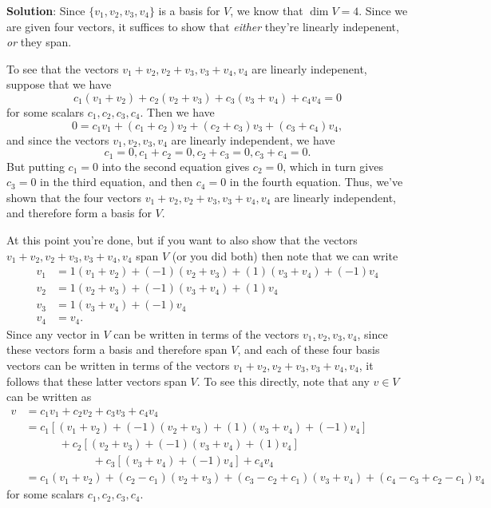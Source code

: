 \documentclass[12pt]{article}
\begin{document}
\begin{enumerate}
\bigskip

{\bf Solution}: Since $\{v_1,v_2,v_3,v_4\}$ is a basis for $V$, we know that $\dim V=4$. Since we are given four vectors, it suffices to show that {\em either} they're linearly indepenent,  {\em or} they span.

To see that the vectors $ v_1+v_2,v_2+v_3,v_3+v_4,v_4$ are linearly indepenent, suppose that we have
\[
 c_1(v_1+v_2)+c_2(v_2+v_3)+c_3(v_3+v_4)+c_4v_4=0
\]
for some scalars $c_1,c_2,c_3,c_4$. Then we have
\[
 0 = c_1v_1+(c_1+c_2)v_2+(c_2+c_3)v_3+(c_3+c_4)v_4,
\]
and since the vectors $v_1,v_2,v_3,v_4$ are linearly independent, we have
\[
 c_1=0, c_1+c_2=0, c_2+c_3=0, c_3+c_4=0.
\]
But putting $c_1=0$ into the second equation gives $c_2=0$, which in turn gives $c_3=0$ in the third equation, and then $c_4=0$ in the fourth equation. Thus, we've shown that the four vectors $v_1+v_2, v_2+v_3,v_3+v_4,v_4$ are linearly independent, and therefore form a basis for $V$.

\medskip

At this point you're done, but if you want to also show that the vectors $v_1+v_2, v_2+v_3,v_3+v_4,v_4$ span $V$ (or you did both) then note that we can write
\begin{align*}
 v_1 & = 1(v_1+v_2)+(-1)(v_2+v_3)+(1)(v_3+v_4)+(-1)v_4\\
 v_2 & = 1(v_2+v_3)+(-1)(v_3+v_4)+(1)v_4\\
 v_3 & = 1(v_3+v_4)+(-1)v_4\\
 v_4 & = v_4.
\end{align*}
Since any vector in $V$ can be written in terms of the vectors $v_1,v_2,v_3,v_4$, since these vectors form a basis and therefore span $V$, and each of these four basis vectors can be written in terms of the vectors $v_1+v_2, v_2+v_3,v_3+v_4,v_4$, it follows that these latter vectors span $V$. To see this directly, note that any $v\in V$ can be written as
\begin{align*}
 v & = c_1v_1+c_2v_2+c_3v_3+c_4v_4\\
 & = c_1[(v_1+v_2)+(-1)(v_2+v_3)+(1)(v_3+v_4)+(-1)v_4]\\
 & \quad\quad\quad+c_2[(v_2+v_3)+(-1)(v_3+v_4)+(1)v_4]\\
 &\quad\quad\quad\quad\quad\quad +c_3[(v_3+v_4)+(-1)v_4]+c_4v_4\\
 & = c_1(v_1+v_2)+(c_2-c_1)(v_2+v_3)+(c_3-c_2+c_1)(v_3+v_4)+(c_4-c_3+c_2-c_1)v_4
\end{align*}
for some scalars $c_1,c_2,c_3,c_4$.


\newpage


\end{enumerate}
\end{document}
